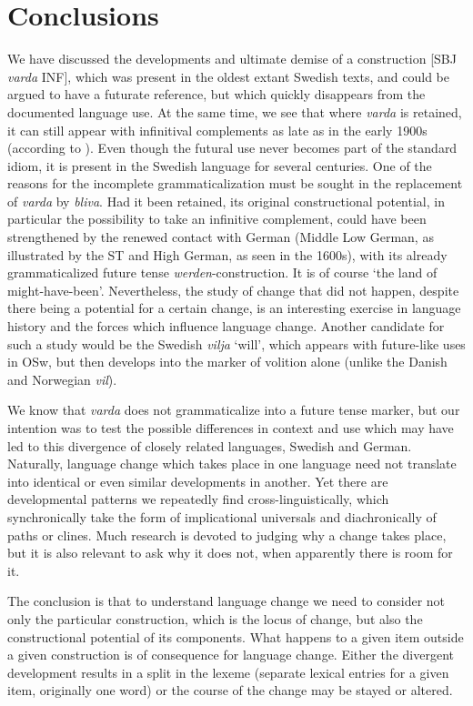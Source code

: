 \documentclass[output=paper,colorlinks,citecolor=brown]{langscibook}
\begin{document}
\section{Conclusions} \label{sec:skrzypek:7}
We have discussed the developments and ultimate demise of a construction [SBJ \textit{varda} INF], which was present in the oldest extant Swedish texts, and could be argued to have a futurate reference, but which quickly disappears from the documented language use. At the same time, we see that where \textit{varda} is retained, it can still appear with infinitival complements as late as in the early 1900s (according to \citeauthor{SAOB}). Even though the futural use never becomes part of the standard idiom, it is present in the Swedish language for several centuries. One of the reasons for the incomplete grammaticalization must be sought in the replacement of \textit{varda} by \textit{bliva}. Had it been retained, its original constructional potential, in particular the possibility to take an infinitive complement, could have been strengthened by the renewed contact with German (Middle Low German, as illustrated by the ST and High German, as seen in the 1600s), with its already grammaticalized future tense \textit{werden}-construction. It is of course ‘the land of might-have-been’. Nevertheless, the study of change that did not happen, despite there being a potential for a certain change, is an interesting exercise in language history and the forces which influence language change. Another candidate for such a study would be the Swedish \textit{vilja} ‘will’, which appears with future-like uses in OSw, but then develops into the marker of volition alone (unlike the Danish and Norwegian \textit{vil}). 

We know that \textit{varda} does not grammaticalize into a future tense marker, but our intention was to test the possible differences in context and use which may have led to this divergence of closely related languages, Swedish and German. Naturally, language change which takes place in one language need not translate into identical or even similar developments in another. Yet there are developmental patterns we repeatedly find cross-linguistically, which synchronically take the form of implicational universals and diachronically of paths or clines. Much research is devoted to judging why a change takes place, but it is also relevant to ask why it does not, when apparently there is room for it. 

The conclusion is that to understand language change we need to consider not only the particular construction, which is the locus of change, but also the constructional potential of its components. What happens to a given item outside a given construction is of consequence for language change. Either the divergent development results in a split in the lexeme (separate lexical entries for a given item, originally one word) or the course of the change may be stayed or altered. 
\end{document}
